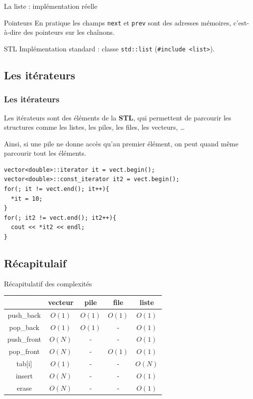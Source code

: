 \begin{frame}{La liste : implémentation réelle}

\begin{block}{Pointeurs}
En pratique les champs \texttt{next} et \texttt{prev} sont des adresses mémoires, c'est-à-dire des pointeurs sur les chaînons.
\end{block}

\begin{exampleblock}{STL}
Implémentation standard : classe \texttt{std::list} (\texttt{\#include <list>}).
\end{exampleblock}

\end{frame}

\subsection{Les itérateurs}

\begin{frame}[fragile]
\frametitle{Les itérateurs}
Les itérateurs sont des éléments de la \textbf{STL}, qui permettent de parcourir les structures comme les listes, les piles, les files, les vecteurs, \dots

Ainsi, si une pile ne donne accès qu'au premier élément, on peut quand même parcourir tout les éléments.

\begin{verbatim}
vector<double>::iterator it = vect.begin();
vector<double>::const_iterator it2 = vect.begin();
for(; it != vect.end(); it++){
  *it = 10;
}
for(; it2 != vect.end(); it2++){
  cout << *it2 << endl;
}
\end{verbatim}
\end{frame}

\subsection{Récapitulaif}

\begin{frame}{Récapitulatif des complexités}
\begin{center}
\begin{tabular}{ c | c | c | c | c }
& vecteur & pile & file & liste\\
\hline
push\_back & $O(1)$ & $O(1)$ & $O(1)$ & $O(1)$\\
\hline
pop\_back & $O(1)$ & $O(1)$ & - & $O(1)$\\
\hline
push\_front & $O(N)$ & - & - & $O(1)$\\
\hline
pop\_front & $O(N)$ & - & $O(1)$ & $O(1)$\\
\hline
tab[i] & $O(1)$ & - & - & $O(N)$\\
\hline
insert & $O(N)$ & - & - & $O(1)$\\
\hline
erase & $O(N)$ & - & - & $O(1)$\\
\hline
\end{tabular}
\end{center}
\end{frame}

